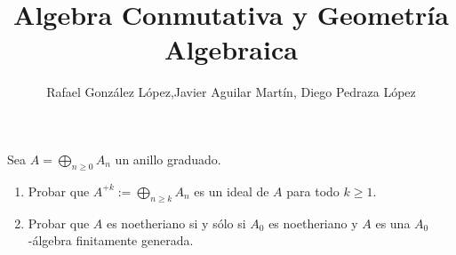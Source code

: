 \documentclass[twoside]{article}
\begin{document}
\title{Algebra Conmutativa y Geometría Algebraica}
\author{Rafael González López,Javier Aguilar Martín,  Diego Pedraza López}
\maketitle

\begin{ejercicio}{1}
Sea $A = \bigoplus_{n≥0} A_n$ un anillo graduado.
\begin{enumerate}
	\item Probar que $A^{+k} := \bigoplus_{n≥k} A_n$ es un ideal de $A$ para todo $k ≥ 1$.
	\item Probar que $A$ es noetheriano si y sólo si $A_0$ es noetheriano y $A$ es una $A_0$-álgebra finitamente generada.
\end{enumerate}
\end{ejercicio}
\end{document}

